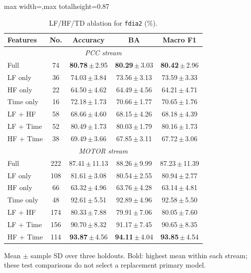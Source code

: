 \documentclass[letterpaper,journal]{IEEEtran}
\begin{document}
\begin{table}[p]
\begin{adjustbox}{max width=\textwidth,max totalheight=0.87\textheight}
\begin{minipage}{\textwidth}
\begin{minipage}[t]{0.48\textwidth}
\centering
\footnotesize
\caption{LF/HF/TD ablation for \texttt{fdia2} (\%).}
\label{tab:lfhf_ablation_anomaly2}
\renewcommand{\arraystretch}{1.15}
\setlength{\tabcolsep}{2.2pt}
\begin{tabular}{@{}lcccc@{}}
\hline
Features & No. & Accuracy & BA & Macro F1 \\\hline
\hline\multicolumn{5}{c}{\textit{PCC stream}} \\\hline
Full & 74 & \mbox{\textbf{80.78}\,$\pm$\,2.95} & \mbox{\textbf{80.29}\,$\pm$\,3.03} & \mbox{\textbf{80.42}\,$\pm$\,2.96} \\
LF only & 36 & \mbox{74.03\,$\pm$\,3.84} & \mbox{73.56\,$\pm$\,3.13} & \mbox{73.59\,$\pm$\,3.33} \\
HF only & 22 & \mbox{64.50\,$\pm$\,4.62} & \mbox{64.49\,$\pm$\,4.56} & \mbox{64.21\,$\pm$\,4.71} \\
Time only & 16 & \mbox{72.18\,$\pm$\,1.73} & \mbox{70.66\,$\pm$\,1.77} & \mbox{70.65\,$\pm$\,1.76} \\
LF + HF & 58 & \mbox{68.66\,$\pm$\,4.60} & \mbox{68.15\,$\pm$\,4.26} & \mbox{68.18\,$\pm$\,4.39} \\
LF + Time & 52 & \mbox{80.49\,$\pm$\,1.73} & \mbox{80.03\,$\pm$\,1.79} & \mbox{80.16\,$\pm$\,1.73} \\
HF + Time & 38 & \mbox{69.49\,$\pm$\,3.66} & \mbox{67.85\,$\pm$\,3.11} & \mbox{67.72\,$\pm$\,3.06} \\
\hline\multicolumn{5}{c}{\textit{MOTOR stream}} \\\hline
Full & 222 & \mbox{87.41\,$\pm$\,11.13} & \mbox{88.26\,$\pm$\,9.99} & \mbox{87.23\,$\pm$\,11.39} \\
LF only & 108 & \mbox{81.61\,$\pm$\,3.08} & \mbox{80.54\,$\pm$\,2.55} & \mbox{80.94\,$\pm$\,2.77} \\
HF only & 66 & \mbox{63.32\,$\pm$\,4.96} & \mbox{63.76\,$\pm$\,4.28} & \mbox{63.14\,$\pm$\,4.81} \\
Time only & 48 & \mbox{92.61\,$\pm$\,5.51} & \mbox{92.89\,$\pm$\,4.96} & \mbox{92.58\,$\pm$\,5.50} \\
LF + HF & 174 & \mbox{80.33\,$\pm$\,7.88} & \mbox{79.91\,$\pm$\,7.06} & \mbox{80.05\,$\pm$\,7.60} \\
LF + Time & 156 & \mbox{90.70\,$\pm$\,8.32} & \mbox{91.17\,$\pm$\,7.45} & \mbox{90.65\,$\pm$\,8.35} \\
HF + Time & 114 & \mbox{\textbf{93.87}\,$\pm$\,4.56} & \mbox{\textbf{94.11}\,$\pm$\,4.04} & \mbox{\textbf{93.85}\,$\pm$\,4.54} \\
\hline\end{tabular}
\par\smallskip\begin{minipage}{\columnwidth}\scriptsize Mean $\pm$ sample SD over three holdouts. Bold: highest mean within each stream; these test comparisons do not select a replacement primary model.\end{minipage}

\end{minipage}
\end{minipage}
\end{adjustbox}
\end{table}
\end{document}
